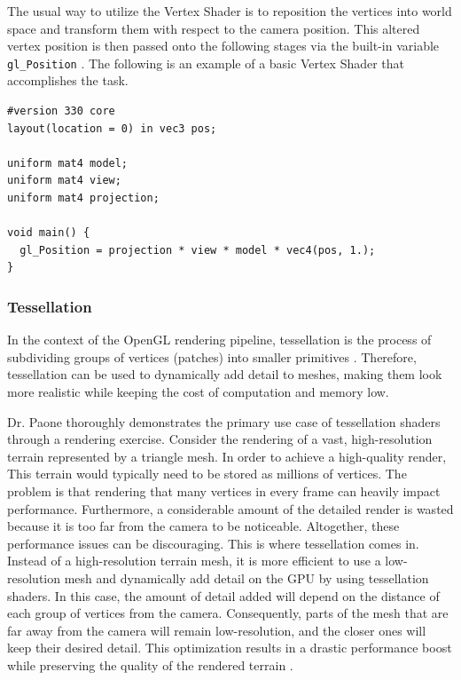 \documentclass[
  digital,     %
  oneside,     %
  nosansbold,  %
  nocolorbold, %
  lof,         %
  lot,         %
]{fithesis4}
\begin{document}
The usual way to utilize
the Vertex Shader is to reposition the vertices into world space and transform them with respect to
the camera position. This altered vertex position is then passed onto the following stages via the
built-in variable \verb|gl_Position| \cite{openglwiki-vertex-shader}. The following is an example
of a basic Vertex Shader that accomplishes the task.
\begin{verbatim}
#version 330 core
layout(location = 0) in vec3 pos;

uniform mat4 model;
uniform mat4 view;
uniform mat4 projection;

void main() {
  gl_Position = projection * view * model * vec4(pos, 1.);
}
\end{verbatim}

\subsubsection{Tessellation}
In the context of the OpenGL rendering pipeline, tessellation is the process of subdividing groups of
vertices (patches) into smaller primitives \cite{openglwiki-tessellation}. Therefore, tessellation can be used to dynamically add
detail to meshes, making them look more realistic while keeping the cost of computation and
memory low.

Dr. Paone \cite{openglwiki-tessellation} thoroughly demonstrates the primary use case of tessellation
shaders through a rendering exercise. Consider the rendering of a vast,
high-resolution terrain represented by a triangle mesh. In order to achieve a high-quality render,
This terrain would typically need to be stored as millions of vertices.
The problem is that rendering that many vertices in every frame can heavily impact performance. Furthermore, a
considerable amount of the detailed render is wasted because it is too far from the camera to be
noticeable. Altogether, these performance issues can be discouraging.
This is where tessellation comes in. Instead of a high-resolution terrain mesh, it is more
efficient to use a low-resolution mesh and dynamically add detail on the GPU by using tessellation
shaders. In this case, the amount of detail added will depend on the distance of each group of
vertices from the camera. Consequently, parts of the mesh that are far away from the camera will
remain low-resolution, and the closer ones will keep their desired detail. This optimization results in
a drastic performance boost while preserving the quality of the rendered terrain \cite{learnopengl-tessellation}.
\end{document}
